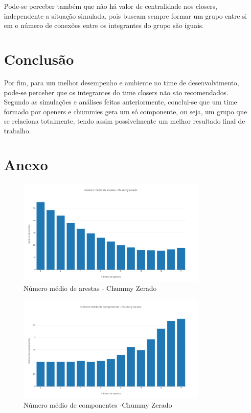 \documentclass[12pt]{article}
\begin{document}
Pode-se perceber também que não há valor de centralidade nos closers, independente a situação simulada, pois buscam sempre formar um grupo entre si em o número de conexões entre os integrantes do grupo são iguais.

\section{Conclusão}

Por fim, para um melhor desempenho e ambiente no time de desenvolvimento, pode-se perceber que os integrantes do time closers não são recomendados. Segundo as simulações e análises feitas anteriormente, conclui-se que um time formado por openers e chummies gera um só componente, ou seja, um grupo que se relaciona totalmente, tendo assim possivelmente um melhor resultado final de trabalho.

\section{Anexo}

\begin{figure}[H]
	\centering
	\includegraphics[width=\textwidth, height=200px]{basic-bar.png}
    \caption{Número médio de arestas - Chummy Zerado}
	\label{fig1}
\end{figure}

\begin{figure}[H]
	\centering
	\includegraphics[width=\textwidth, height=200px]{basic-bar_2.png}
	\caption{Número médio de componentes -Chummy Zerado}
	\label{fig2}
\end{figure}
\end{document}
